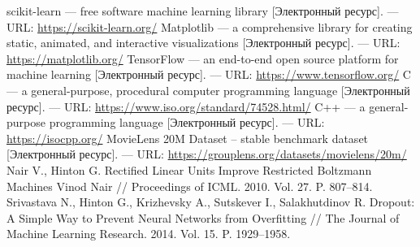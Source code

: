 \documentclass[a4paper,article,14pt]{extarticle}
\begin{document}
\begin{thebibliography}{1}
 scikit-learn --- free software machine learning library [Электронный ресурс]. --- URL: \url{https://scikit-learn.org/}
 Matplotlib --- a comprehensive library for creating static, animated, and interactive visualizations [Электронный ресурс]. --- URL: \url{https://matplotlib.org/}
 TensorFlow --- an end-to-end open source platform for machine learning [Электронный ресурс]. --- URL: \url{https://www.tensorflow.org/}
 C --- a general-purpose, procedural computer programming language [Электронный ресурс]. --- URL: \url{https://www.iso.org/standard/74528.html/}
 C++ --- a general-purpose programming language [Электронный ресурс]. --- URL: \url{https://isocpp.org/}
 MovieLens 20M Dataset -- stable benchmark dataset [Электронный ресурс]. --- URL: \url{https://grouplens.org/datasets/movielens/20m/}
 Nair V., Hinton G. Rectified Linear Units Improve Restricted Boltzmann Machines Vinod Nair // Proceedings of ICML. 2010. Vol. 27. P. 807--814.
 Srivastava N., Hinton G., Krizhevsky A., Sutskever I., Salakhutdinov R. Dropout: A Simple Way to Prevent Neural Networks from Overfitting // The Journal of Machine Learning Research. 2014. Vol. 15. P. 1929--1958.
\end{thebibliography}
\end{document}
